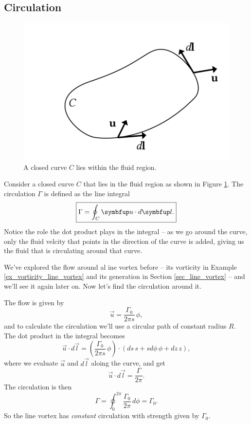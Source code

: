 \subsection{Circulation}
\label{sec_circulation}

\begin{figure}
\centering\includegraphics[width=0.5\linewidth]{Figures/Chapter3/fig_circ}
\caption{A closed curve $C$ lies within the fluid region.}
\label{fig_circ}
\end{figure}

Consider a closed curve $C$ that lies in the fluid region as shown in Figure \ref{fig_circ}.  The circulation $\Gamma$ is defined as the line integral
\begin{equation}
\boxed{
\Gamma = \oint_C \uu \cdot d\vec{l}.
}
\label{eq_circ}
\end{equation}
Notice the role the dot product plays in the integral -- as we go around the curve, only the fluid velcity that points in the direction of the curve is added, giving us the fluid that is circulating around that curve.

\begin{example}
We've explored the flow around al ine vortex before -- its vorticity in Example \ref{ex_vorticity_line_vortex} and its generation in Section \ref{sec_line_vortex} -- and we'll see it again later on.  Now let's find the circulation around it.

The flow is given by
\[
\vec{u} = \frac{\Gamma_0}{2\pi s} \, \unit{\phi},
\]
and to calculate the circulation we'll use a circular path of constant radius $R$.  The dot product in the integral becomes
\[
\vec{u} \cdot d\vec{l} = \left( \frac{\Gamma_0}{2\pi s} \, \unit{\phi} \right) \cdot \left( ds \, \unit{s} + s d\phi \, \unit{\phi} + dz \, \unit{z} \right),
\]
where we evaluate $\vec{u}$ and $d\vec{l}$ aloing the curve, and get
\[
\vec{u} \cdot d\vec{l} = \frac{\Gamma}{2\pi}.
\]
The circulation is then
\[
\Gamma = \oint_0^{2\pi} \frac{\Gamma_0}{2\pi} \, d\phi = \Gamma_0.
\]
So the line vortex has \emph{constant} circulation with strength given by $\Gamma_0$.
\end{example}


